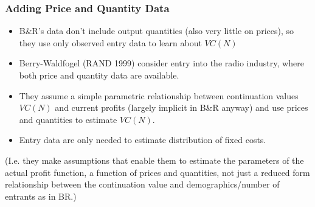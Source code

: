 \documentclass[notes=show]{beamer}
\begin{document}
\begin{frame}%

\frametitle{Adding Price and Quantity Data}

\begin{itemize}
\item B\&R's data don't include output quantities (also very little on
prices), so they use only observed entry data to learn about $VC(N)$

\item Berry-Waldfogel (RAND 1999) consider entry into the radio industry,
where both price and quantity data are available.

\item They assume a simple parametric relationship between continuation
values $VC(N)$ and current profits (largely implicit in B\&R anyway) and use
prices and quantities to estimate $VC(N)$.

\item Entry data are only needed to estimate distribution of fixed costs.
\end{itemize}

(I.e. they make assumptions that enable them to estimate the parameters of
the actual profit function, a function of prices and quantities, not just a
reduced form relationship between the continuation value and
demographics/number of entrants as in BR.)

\end{frame}%
\end{document}
